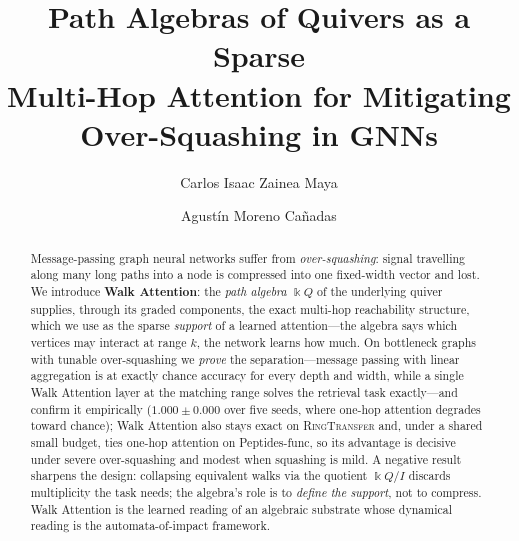 \documentclass[runningheads]{llncs}
\newcommand{\kk}{\Bbbk}
\newcommand{\kQ}{\kk Q}
\begin{document}
\title{Path Algebras of Quivers as a Sparse\\ Multi-Hop Attention for Mitigating\\ Over-Squashing in GNNs}

\author{Carlos Isaac Zainea Maya \and
Agust\'in Moreno Ca\~nadas}

\maketitle

\begin{abstract}
Message-passing graph neural networks suffer from \emph{over-squashing}: signal
travelling along many long paths into a node is compressed into one fixed-width
vector and lost. We introduce \textbf{Walk Attention}: the \emph{path algebra}
$\kQ$ of the underlying quiver supplies, through its graded components, the
exact multi-hop reachability structure, which we use as the sparse
\emph{support} of a learned attention---the algebra says which vertices may
interact at range $k$, the network learns how much. On bottleneck graphs with
tunable over-squashing we \emph{prove} the separation---message passing with
linear aggregation is at exactly chance accuracy for every depth and width,
while a single Walk Attention layer at the matching range solves the retrieval
task exactly---and confirm it empirically ($1.000\pm0.000$ over five seeds,
where one-hop attention degrades toward chance); Walk Attention also stays
exact on \textsc{RingTransfer} and, under a shared small budget, ties one-hop
attention on Peptides-func, so its advantage is decisive under severe
over-squashing and modest when squashing is mild. A negative result sharpens
the design: collapsing equivalent walks via the quotient $\kQ/I$ discards
multiplicity the task needs; the algebra's role is to \emph{define the support},
not to compress. Walk Attention is the learned reading of an algebraic
substrate whose dynamical reading is the automata-of-impact framework.

\end{abstract}
\end{document}
